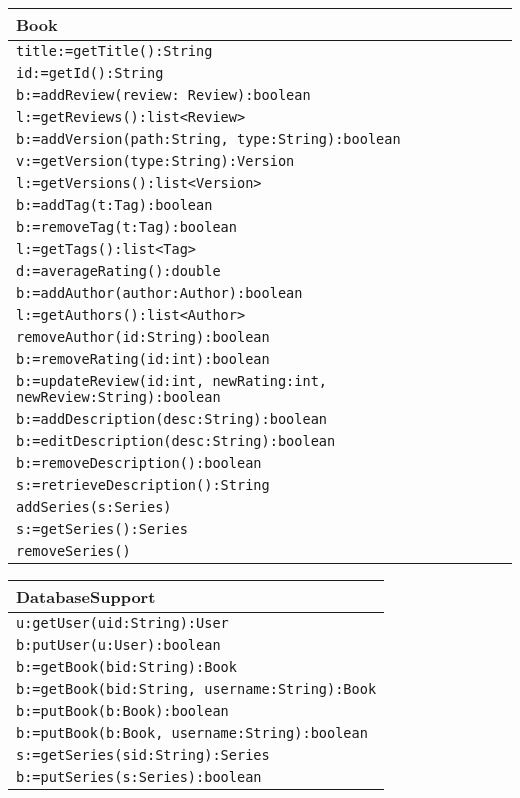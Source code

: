 \documentclass[12pt]{article}
\begin{document}
\begin{tabular}{| l |}
    \hline
    Book\\
    \hline
    \texttt{title:=getTitle():String}\\
    \texttt{id:=getId():String}\\
    \texttt{b:=addReview(review: Review):boolean}\\
    \texttt{l:=getReviews():list<Review>}\\
    \texttt{b:=addVersion(path:String, type:String):boolean}\\
    \texttt{v:=getVersion(type:String):Version}\\
    \texttt{l:=getVersions():list<Version>}\\
    \texttt{b:=addTag(t:Tag):boolean}\\
    \texttt{b:=removeTag(t:Tag):boolean}\\
    \texttt{l:=getTags():list<Tag>}\\
    \texttt{d:=averageRating():double}\\
    \texttt{b:=addAuthor(author:Author):boolean}\\
  \texttt{l:=getAuthors():list<Author>}\\
  \texttt{removeAuthor(id:String):boolean}\\
    \texttt{b:=removeRating(id:int):boolean}\\
    \texttt{b:=updateReview(id:int, newRating:int, newReview:String):boolean}\\
    \texttt{b:=addDescription(desc:String):boolean}\\
    \texttt{b:=editDescription(desc:String):boolean}\\
    \texttt{b:=removeDescription():boolean}\\
    \texttt{s:=retrieveDescription():String}\\
    \texttt{addSeries(s:Series)}\\
    \texttt{s:=getSeries():Series}\\
    \texttt{removeSeries()}\\
    \hline
\end{tabular}

\vspace{1cm}

\begin{tabular}{| l |}
    \hline
    DatabaseSupport\\
    \hline
    \texttt{u:getUser(uid:String):User}\\
    \texttt{b:putUser(u:User):boolean}\\
    \texttt{b:=getBook(bid:String):Book}\\
    \texttt{b:=getBook(bid:String, username:String):Book}\\
    \texttt{b:=putBook(b:Book):boolean}\\
    \texttt{b:=putBook(b:Book, username:String):boolean}\\
    \texttt{s:=getSeries(sid:String):Series}\\
        \texttt{b:=putSeries(s:Series):boolean}\\
    \hline
\end{tabular}
\vspace{1cm}
\end{document}
